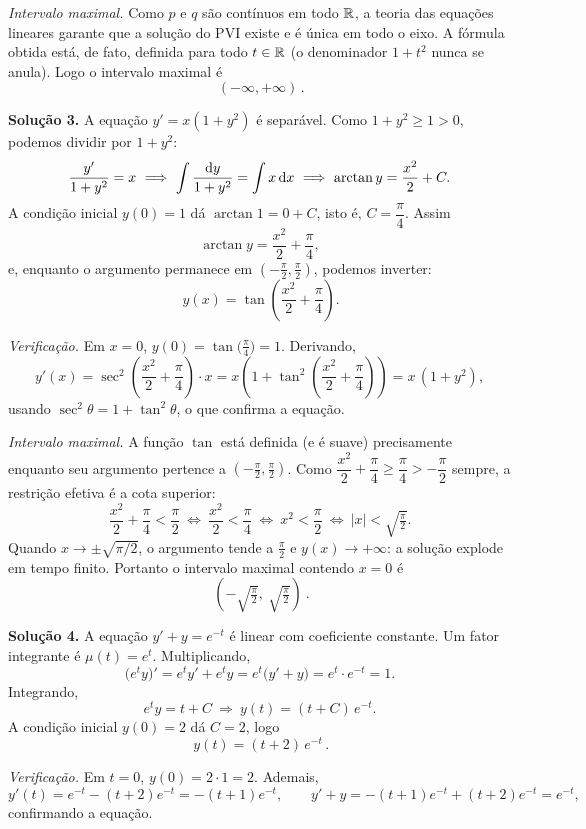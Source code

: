 \emph{Intervalo maximal.} Como $p$ e $q$ são contínuos em todo $\mathbb{R}$, a teoria das equações lineares garante que a solução do PVI existe e é única em todo o eixo. A fórmula obtida está, de fato, definida para todo $t\in\mathbb{R}$ (o denominador $1+t^2$ nunca se anula). Logo o intervalo maximal é
\[
\boxed{\,(-\infty,+\infty)\,}.
\]

\bigskip\noindent\textbf{Solução 3.}\quad
A equação $y'=x(1+y^2)$ é separável. Como $1+y^2\ge 1>0$, podemos dividir por $1+y^2$:
\[
\frac{y'}{1+y^2}=x\ \Longrightarrow\ \int\frac{\d y}{1+y^2}=\int x\,\d x\ \Longrightarrow\ \arctan y=\frac{x^2}{2}+C.
\]
A condição inicial $y(0)=1$ dá $\arctan 1=0+C$, isto é, $C=\dfrac{\pi}{4}$. Assim
\[
\arctan y=\frac{x^2}{2}+\frac{\pi}{4},
\]
e, enquanto o argumento permanece em $\left(-\tfrac\pi2,\tfrac\pi2\right)$, podemos inverter:
\[
\boxed{\,y(x)=\tan\!\left(\frac{x^2}{2}+\frac{\pi}{4}\right)}.
\]

\emph{Verificação.} Em $x=0$, $y(0)=\tan\!\big(\tfrac\pi4\big)=1$. Derivando,
\[
y'(x)=\sec^2\!\left(\frac{x^2}{2}+\frac{\pi}{4}\right)\cdot x=x\left(1+\tan^2\!\left(\frac{x^2}{2}+\frac{\pi}{4}\right)\right)=x\,(1+y^2),
\]
usando $\sec^2\theta=1+\tan^2\theta$, o que confirma a equação.

\emph{Intervalo maximal.} A função $\tan$ está definida (e é suave) precisamente enquanto seu argumento pertence a $\left(-\tfrac\pi2,\tfrac\pi2\right)$. Como $\dfrac{x^2}{2}+\dfrac{\pi}{4}\ge \dfrac{\pi}{4}>-\dfrac{\pi}{2}$ sempre, a restrição efetiva é a cota superior:
\[
\frac{x^2}{2}+\frac{\pi}{4}<\frac{\pi}{2}\ \Longleftrightarrow\ \frac{x^2}{2}<\frac{\pi}{4}\ \Longleftrightarrow\ x^2<\frac{\pi}{2}\ \Longleftrightarrow\ |x|<\sqrt{\tfrac{\pi}{2}}.
\]
Quando $x\to \pm\sqrt{\pi/2}$, o argumento tende a $\tfrac\pi2$ e $y(x)\to+\infty$: a solução explode em tempo finito. Portanto o intervalo maximal contendo $x=0$ é
\[
\boxed{\ \left(-\sqrt{\tfrac{\pi}{2}},\ \sqrt{\tfrac{\pi}{2}}\right)\ }.
\]

\bigskip\noindent\textbf{Solução 4.}\quad
A equação $y'+y=e^{-t}$ é linear com coeficiente constante. Um fator integrante é $\mu(t)=e^{t}$. Multiplicando,
\[
\big(e^{t}y\big)'=e^{t}y'+e^{t}y=e^{t}\big(y'+y\big)=e^{t}\cdot e^{-t}=1.
\]
Integrando,
\[
e^{t}y=t+C\ \Longrightarrow\ y(t)=(t+C)\,e^{-t}.
\]
A condição inicial $y(0)=2$ dá $C=2$, logo
\[
\boxed{\,y(t)=(t+2)\,e^{-t}\,}.
\]

\emph{Verificação.} Em $t=0$, $y(0)=2\cdot 1=2$. Ademais,
\[
y'(t)=e^{-t}-(t+2)e^{-t}=-(t+1)e^{-t},
\qquad
y'+y=-(t+1)e^{-t}+(t+2)e^{-t}=e^{-t},
\]
confirmando a equação.

